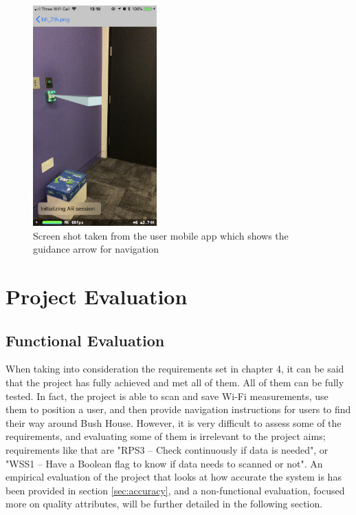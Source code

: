 \begin{figure}[H]
    \centering
    \includegraphics[width=180px, height=320px]{Evaluation/AR-arrow.png}
    \caption{Screen shot taken from the user mobile app which shows the guidance arrow for navigation}
    \label{fig:ar-arrow}
\end{figure}

\section{Project Evaluation}

\subsection{Functional Evaluation}
When taking into consideration the requirements set in chapter 4, it can be said that the project has fully achieved and met all of them. All of them can be fully tested. In fact, the project is able to scan and save Wi-Fi measurements, use them to position a user, and then provide navigation instructions for users to find their way around Bush House. However, it is very difficult to assess some of the requirements, and evaluating some of them is irrelevant to the project aims; requirements like that are "RPS3 – Check continuously if data is needed", or "WSS1 – Have a Boolean flag to know if data needs to scanned or not". An empirical evaluation of the project that looks at how accurate the system is has been provided in section \ref{sec:accuracy}, and a non-functional evaluation, focused more on quality attributes, will be further detailed in the following section.

